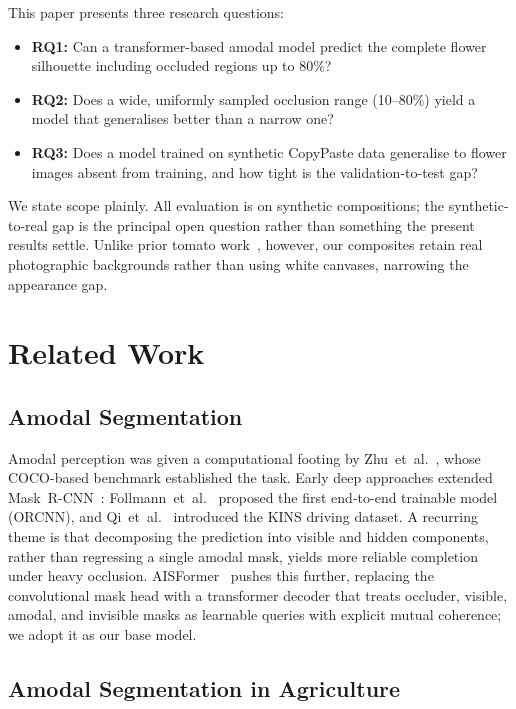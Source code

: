 \documentclass[conference]{IEEEtran}
\begin{document}
This paper presents three research questions:
\begin{itemize}
  \item \textbf{RQ1:} Can a transformer-based amodal model predict the
        complete flower silhouette including occluded regions up to 80\%?
  \item \textbf{RQ2:} Does a wide, uniformly sampled occlusion range
        (10--80\%) yield a model that generalises better than a narrow one?
  \item \textbf{RQ3:} Does a model trained on synthetic CopyPaste data
        generalise to flower images absent from training, and how tight is the
        validation-to-test gap?
\end{itemize}

We state scope plainly.
All evaluation is on synthetic compositions; the synthetic-to-real gap is
the principal open question rather than something the present results settle.
Unlike prior tomato work~\cite{saadatpour2025tomato}, however, our
composites retain real photographic backgrounds rather than using white
canvases, narrowing the appearance gap.

\section{Related Work}

\subsection{Amodal Segmentation}

Amodal perception was given a computational footing by Zhu~et~al.~\cite{zhu2017semantic},
whose COCO-based benchmark established the task.
Early deep approaches extended Mask~R-CNN~\cite{he2017mask}: Follmann~et~al.~\cite{follmann2019orcnn}
proposed the first end-to-end trainable model (ORCNN), and Qi~et~al.~\cite{qi2019kins}
introduced the KINS driving dataset.
A recurring theme is that decomposing the prediction into visible and hidden
components, rather than regressing a single amodal mask, yields more reliable
completion under heavy occlusion.
AISFormer~\cite{tran2022aisformer} pushes this further, replacing the
convolutional mask head with a transformer decoder that treats occluder,
visible, amodal, and invisible masks as learnable queries with explicit mutual
coherence; we adopt it as our base model.

\subsection{Amodal Segmentation in Agriculture}
\end{document}

